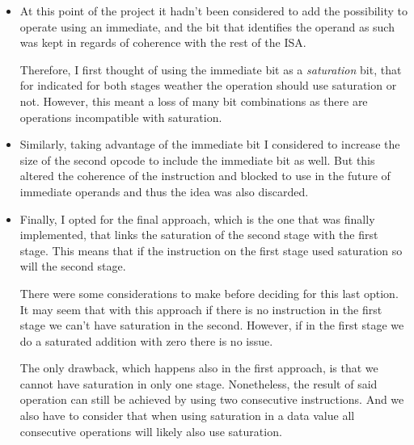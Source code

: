 \begin{itemize}
    \item At this point of the project it hadn't been considered to add
        the possibility to operate using an immediate, and the bit that 
        identifies the operand as such was kept in regards of coherence 
        with the rest of the ISA.
        
        \medbreak
        Therefore, I first thought of using the immediate bit as a \textit{saturation}
        bit, that for indicated for both stages weather the operation 
        should use saturation or not. However, this meant a loss of many
        bit combinations as there are operations incompatible with 
        saturation. 

    \item Similarly, taking advantage of the immediate bit I considered to
        increase the size of the second opcode to include the immediate bit 
        as well. But this altered the coherence of the instruction and 
        blocked to use in the future of immediate operands and thus the
        idea was also discarded.

    \item Finally, I opted for the final approach, which is the one that
        was finally implemented, that links the saturation of the second
        stage with the first stage. This means that if the instruction on
        the first stage used saturation so will the second stage.

        \medbreak
        There were some considerations to make before deciding for this 
        last option. It may seem that with this approach if there is no
        instruction in the first stage we can't have saturation in the 
        second. However, if in the first stage we do a saturated addition
        with zero there is no issue. 

        \medbreak
        The only drawback, which happens also in the first approach, is 
        that we cannot have saturation in only one stage. Nonetheless, the
        result of said operation can still be achieved by using two consecutive
        instructions. And we also have to consider that when using saturation
        in a data value all consecutive operations will likely also use 
        saturation.
\end{itemize}
